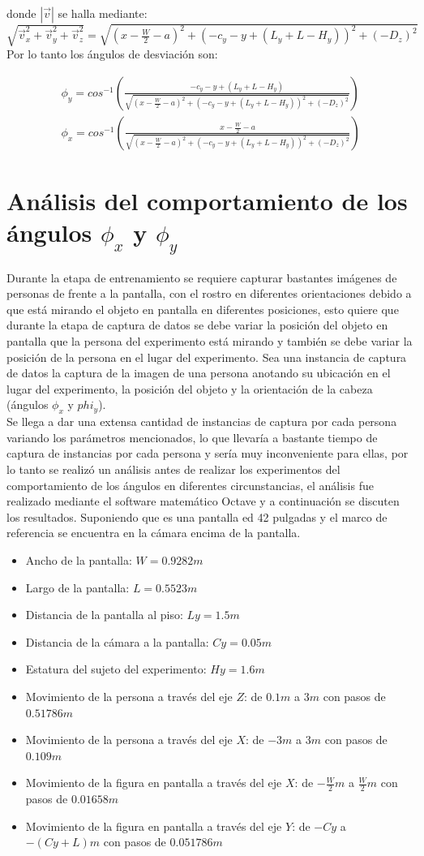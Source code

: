 \documentclass[paper=a4, fontsize=11pt]{scrartcl} %
\numberwithin{equation}{section} %
\numberwithin{figure}{section} %
\numberwithin{table}{section} %
\begin{document}
  donde $|\vec v|$ se halla mediante: $\sqrt{\vec v_{x}^2+\vec v_{y}^2+\vec v_{z}^2}=\sqrt{(x-\frac{W}{2}-a)^2+(-c_y-y+(L_y+L-H_y))^2+(-D_z)^2}$
  \\Por lo tanto los ángulos de desviación son:
  
  \begin{eqnarray}
  \phi_y=cos^{-1} (\frac{-c_y-y+(L_y+L-H_y)}{\sqrt{(x-\frac{W}{2}-a)^2+(-c_y-y+(L_y+L-H_y))^2+(-D_z)^2}})\\
  \phi_x=cos^{-1}(\frac{x-\frac{W}{2}-a}{\sqrt{(x-\frac{W}{2}-a)^2+(-c_y-y+(L_y+L-H_y))^2+(-D_z)^2}})
  \end{eqnarray}
  
 \section{Análisis del comportamiento de los ángulos $\phi_x$ y $\phi_y$} 
Durante la etapa de entrenamiento se requiere capturar bastantes imágenes de personas de frente a la pantalla, con el rostro en diferentes orientaciones debido a que está mirando el objeto en pantalla en diferentes posiciones, esto quiere que durante la etapa de captura de datos se debe variar la posición del objeto en pantalla que la persona del experimento está mirando y también se debe variar la posición de la persona en el lugar del experimento. Sea una instancia de captura de datos la captura de la imagen de una persona anotando su ubicación en el lugar del experimento, la posición del objeto y la orientación de la cabeza (ángulos $\phi_x$ y $phi_y$).
\\Se llega a dar una extensa cantidad de instancias de captura por cada persona variando los parámetros mencionados, lo que llevaría a bastante tiempo de captura de instancias por cada persona y sería muy inconveniente para ellas, por lo tanto se realizó un análisis antes de realizar los experimentos del comportamiento de los ángulos en diferentes circunstancias, el análisis fue realizado mediante el software matemático Octave y a continuación se discuten los resultados.
Suponiendo que es una pantalla ed 42 pulgadas y el marco de referencia se encuentra en la cámara encima de la pantalla.
\begin{itemize}
	\item Ancho de la pantalla: $W=0.9282m$
	\item Largo de la pantalla: $L=0.5523m$
	\item Distancia de la pantalla al piso: $Ly=1.5m$
	\item Distancia de la cámara a la pantalla: $Cy=0.05m$
	\item Estatura del sujeto del experimento: $Hy=1.6m$
	\item Movimiento de la persona a través del eje $Z$: de $0.1m$ a $3m$ con pasos de $0.51786m$
	\item Movimiento de la persona a través del eje $X$: de $-3m$ a $3m$ con pasos de $0.109m$
	\item Movimiento de la figura en pantalla a través del eje $X$: de $-\frac{W}{2}m$ a $\frac{W}{2}m$ con pasos de $0.01658m$
	\item Movimiento de la figura en pantalla a través del eje $Y$: de $-Cy$ a $-(Cy+L)m$ con pasos de $0.051786m$
\end{itemize}
\end{document}
